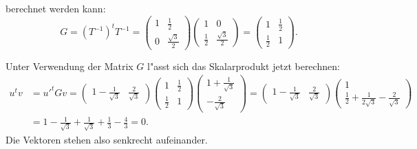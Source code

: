\begin{loesung}
\begin{teilaufgaben}
berechnet werden kann:
\[
G
=
(T^{-1})^tT^{-1}
=
\begin{pmatrix}1&\frac12\\0&\frac{\sqrt{3}}2\end{pmatrix}
\begin{pmatrix}1&0\\\frac12&\frac{\sqrt{3}}2\end{pmatrix}
=
\begin{pmatrix} 1&\frac12\\\frac12&1 \end{pmatrix}.
\]
\item
Unter Verwendung der Matrix $G$ l"asst sich das Skalarprodukt jetzt berechnen:
\begin{align*}
u^tv
&=
u'^tGv
=
\begin{pmatrix} 1-\frac1{\sqrt{3}}&\frac2{\sqrt{3}} \end{pmatrix}
\begin{pmatrix} 1&\frac12\\\frac12&1 \end{pmatrix}
\begin{pmatrix} 1+\frac1{\sqrt{3}}\\-\frac2{\sqrt{3}} \end{pmatrix}
=
\begin{pmatrix} 1-\frac1{\sqrt{3}}&\frac2{\sqrt{3}} \end{pmatrix}
\begin{pmatrix} 1\\
\frac12+\frac1{2\sqrt{3}}-\frac2{\sqrt{3}}
\end{pmatrix}
\\
&=
1-\frac1{\sqrt{3}}
+
\frac1{\sqrt{3}}+\frac13-\frac43
=
0.
\end{align*}
Die Vektoren stehen also senkrecht aufeinander.
\qedhere
\end{teilaufgaben}
\end{loesung}

